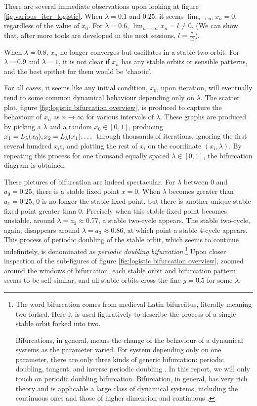 There are several immediate observations upon looking at figure \ref{fig:various_iter_logistic}.
When $\lambda = 0.1$ and $0.25$, it seems $\lim_{n \rightarrow \infty} x_n = 0$, regardless of the value of $x_0$.
For $\lambda = 0.6$, $\lim_{n \rightarrow \infty} x_n = l \neq 0$. 
(We can show that, after more tools are developed in the next sessions, $l = \frac{7}{12}$). 

When $\lambda = 0.8$, $x_n$ no longer converges but oscillates in a stable two orbit. 
For $\lambda = 0.9$ and $\lambda = 1$, it is not clear if $x_n$ has any stable orbits or sensible patterns, and the best epithet for them would be `chaotic'.

For all cases, it seems like any initial condition, $x_0$, upon iteration, will eventually tend to some common dynamical behaviour depending only on $\lambda$.
The scatter plot, figure \ref{fig:logistic bifurcation overview}, is produced to capture the behaviour of $x_n$ as $n \rightarrow \infty$ for various intervals of $\lambda$.
These graphs are produced by picking a $\lambda$ and a random $x_0 \in [0,1]$, producing $x_{1} = L_{\lambda}(x_0), x_{2} = L_{\lambda}(x_1), \dots$ through thousands of iterations, ignoring the first several hundred $x_i$s, and plotting the rest of $x_i$ on the coordinate $(x_i, \lambda)$. 
By repeating this process for one thousand equally spaced $\lambda \in [0,1]$, the bifurcation diagram is obtained.

These pictures of bifurcation are indeed spectacular. 
For $\lambda$ between $0$ and $a_0 = 0.25$, there is a stable fixed point $x = 0$.
When $\lambda$ becomes greater than $a_1 = 0.25$, $0$ is no longer the stable fixed point, but there is another unique stable fixed point greater than $0$.
Precisely when this stable fixed point becomes unstable, around $\lambda = a_2 \approx 0.77$, a stable two-cycle appears.
The stable two-cycle, again, disappears around $\lambda = a_3 \approx 0.86$, at which point a stable 4-cycle appears. 
This process of periodic doubling of the stable orbit, which seems to continue indefinitely, is denominated as \emph{periodic doubling bifurcation}.\footnote{
	The word bifurcation comes from medieval Latin bifurcātus, literally meaning two-forked.
	Here it is used figuratively to describe the process of a single stable orbit forked into two.
	
	Bifurcations, in general, means the change of the behaviour of a dynamical systems as the parameter varied.
	For system depending only on one parameter, there are only three kinds of generic bifurcation: periodic doubling, tangent, and inverse periodic doubling \cite{Chaos_in_DS}.
	In this report, we will only touch on periodic doubling bifurcation.
	Bifurcation, in general, has very rich theory and is applicable a large class of dynamical systems, including the continuous ones and those of higher dimension and continuous  \cite{dynamical_systems_v}.
}
Upon closer inspection of the sub-figures of figure \ref{fig:logistic bifurcation overview}, zoomed around the windows of bifurcation, each stable orbit and bifurcation pattern seems to be self-similar, and all stable orbits cross the line $y = 0.5$ for some $\lambda$.

